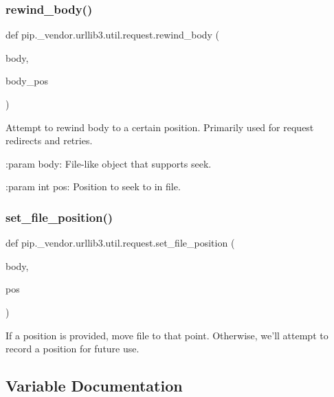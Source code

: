 \subsubsection{\texorpdfstring{rewind\+\_\+body()}{rewind\_body()}}
{\footnotesize\ttfamily def pip.\+\_\+vendor.\+urllib3.\+util.\+request.\+rewind\+\_\+body (\begin{DoxyParamCaption}\item[{}]{body,  }\item[{}]{body\+\_\+pos }\end{DoxyParamCaption})}

\begin{DoxyVerb}Attempt to rewind body to a certain position.
Primarily used for request redirects and retries.

:param body:
    File-like object that supports seek.

:param int pos:
    Position to seek to in file.
\end{DoxyVerb}
 \mbox{\label{namespacepip_1_1__vendor_1_1urllib3_1_1util_1_1request_a9669107e7f9df3e15b03ee825c79b96a}} 
\subsubsection{\texorpdfstring{set\+\_\+file\+\_\+position()}{set\_file\_position()}}
{\footnotesize\ttfamily def pip.\+\_\+vendor.\+urllib3.\+util.\+request.\+set\+\_\+file\+\_\+position (\begin{DoxyParamCaption}\item[{}]{body,  }\item[{}]{pos }\end{DoxyParamCaption})}

\begin{DoxyVerb}If a position is provided, move file to that point.
Otherwise, we'll attempt to record a position for future use.
\end{DoxyVerb}
 

\subsection{Variable Documentation}
\mbox{\label{namespacepip_1_1__vendor_1_1urllib3_1_1util_1_1request_a4a84608dee70695d1c935ab959a72f96}} 
